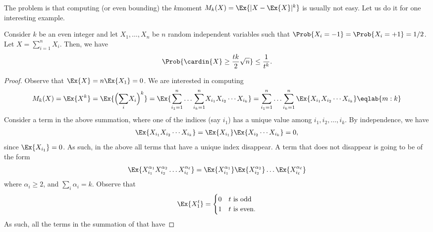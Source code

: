 The problem is that computing (or even bounding) the $k$\th moment
$M_k(X) = \Ex{|X-\Ex{X}|^k}$ is usually not easy. Let us do it for one
interesting example.
\begin{lemma}
    Consider $k$ be an even integer and let $X_1, \ldots, X_n$ be $n$
    random independent variables such that
    $\Prob{X_i=-1} = \Prob{X_i =+1} = 1/2$. Let
    $X = \sum_{i=1}^n X_i$. Then, we have
    \begin{align*}
      \Prob{\cardin{X} \geq \frac{tk}{2} \sqrt{n}}%
      \leq%
      \frac{1}{t^k}.
    \end{align*}
\end{lemma}
\begin{proof}    
    Observe that $\Ex{X} = n \Ex{X_1} = 0$.  We are interested in
    computing
    \begin{equation}
        M_k(X)%
        =%
        \Ex{  X^{k}}%
        =%
        \Ex{  \Bigl(\smash{\sum_i} X_i \Bigr)^{k}}%
        =%
        \Ex{\Bigl. \smash{\sum_{i_1=1}^n}  \ldots \smash{\sum_{i_k=1}^n}  X_{i_1} X_{i_2} \cdots
           X_{i_k} }%
        =%
        \sum_{i_1=1}^n  \ldots \sum_{i_k=1}^n
        \Ex{X_{i_1} X_{i_2} \cdots
           X_{i_k} }%
        \eqlab{m:k}
    \end{equation}
    Consider a term in the above summation, where one of the indices
    (say $i_1$) has a unique value among $i_1, i_2, \ldots, i_k$. By
    independence, we have
    \begin{align*}
      \Ex{X_{i_1} X_{i_2} \cdots X_{i_k} }
      = 
      \Ex{X_{i_1}}\Ex{ X_{i_2} \cdots X_{i_k} } = 0,
    \end{align*}
    since $\Ex{X_{i_1}} = 0$.  As such, in the above all terms that
    have a unique index disappear. A term that does not disappear is
    going to be of the form
    \begin{equation*}
        \Ex{X_{i_1}^{\alpha_1} X_{i_2}^{\alpha_2} \ldots
           X_{i_\ell}^{\alpha_\ell}}
        =%
        \Ex{X_{i_1}^{\alpha_1}}\Ex{ X_{i_2}^{\alpha_2}} \ldots
        \Ex{ X_{i_\ell}^{\alpha_\ell}}
    \end{equation*}
    where $\alpha_i \geq 2$, and $\sum_i \alpha_i = k$. Observe that
    \[
        \Ex{X_1^t} =\begin{cases}
            0 & t \text{ is odd}\\
            1 & t \text{ is even.}
        \end{cases}
    \]
    As such, all the terms in the summation of  that have

\end{proof}
